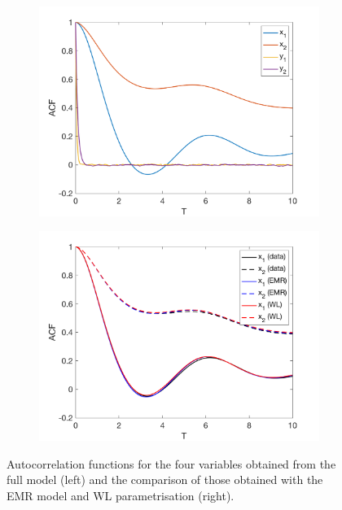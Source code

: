 \documentclass[12pt]{article}
\begin{document}
\begin{figure}[H]
	\centering
	\begin{subfigure}[b]{0.49\textwidth}
		\centering
		\includegraphics[width=\textwidth]{plots/climate_model/h01/acf_data_05_01.png}
	\end{subfigure}
	\begin{subfigure}[b]{0.49\textwidth}
		\centering
		\includegraphics[width=\textwidth]{plots/climate_model/h01/acf_e05_h01.png}
	\end{subfigure}
	\caption{\label{autocorrelations epsilon 1}Autocorrelation functions for the four variables obtained from the full model (left) and the comparison of those obtained with the EMR model and WL parametrisation (right).}
\end{figure}
\end{document}
